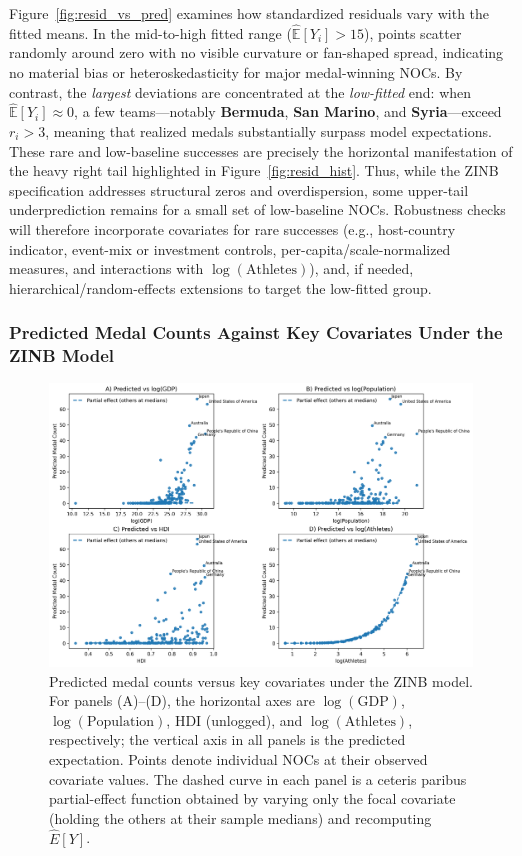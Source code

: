 \documentclass[11pt,twoside]{article}
\numberwithin{Theorem}{section}
\numberwithin{Definition}{section}
\numberwithin{Lemma}{section}
\numberwithin{Algorithm}{section}
\numberwithin{equation}{section}
\begin{document}
Figure~\ref{fig:resid_vs_pred} examines how standardized residuals vary with the 
fitted means. In the mid-to-high fitted range ($\widehat{\mathbb{E}}[Y_i]>15$), 
points scatter randomly around zero with no visible curvature or fan-shaped spread, 
indicating no material bias or heteroskedasticity for major medal-winning NOCs. 
By contrast, the \emph{largest} deviations are concentrated at the \emph{low-fitted} 
end: when $\widehat{\mathbb{E}}[Y_i]\approx 0$, a few teams---notably 
\textbf{Bermuda}, \textbf{San Marino}, and \textbf{Syria}---exceed $r_i>3$, 
meaning that realized medals substantially surpass model expectations. 
These rare and low-baseline successes are precisely the horizontal manifestation
of the heavy right tail highlighted in Figure~\ref{fig:resid_hist}. 
Thus, while the ZINB specification addresses structural zeros and overdispersion, 
some upper-tail underprediction remains for a small set of low-baseline NOCs. 
Robustness checks will therefore incorporate covariates for rare successes 
(e.g., host-country indicator, event-mix or investment controls, per-capita/scale-normalized 
measures, and interactions with $\log(\mathrm{Athletes})$), and, if needed, 
hierarchical/random-effects extensions to target the low-fitted group.

\subsubsection{Predicted Medal Counts Against Key Covariates Under the ZINB Model}
\label{subsubsec:fourpanels-rev}

\begin{figure}[H]
  \centering
  \includegraphics[width=\linewidth]{four_panels_zinb.png}
  \caption{Predicted medal counts versus key covariates under the ZINB model.
For panels (A)--(D), the horizontal axes are $\log(\mathrm{GDP})$,
$\log(\mathrm{Population})$, HDI (unlogged), and $\log(\mathrm{Athletes})$,
respectively; the vertical axis in all panels is the predicted expectation. Points denote individual NOCs
at their observed covariate values. The dashed curve in each panel is a
ceteris paribus partial-effect function obtained by varying only the focal
covariate (holding the others at their sample medians) and recomputing
$\widehat{E}[Y]$.}

  \label{fig:four-panels-zinb}
\end{figure}
\end{document}
